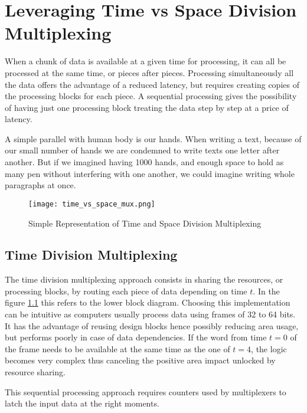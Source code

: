 \chapter{Leveraging Time vs Space Division Multiplexing}\label{ch:leveraging-time-division-multiplexing}

When a chunk of data is available at a given time for processing, it can all be processed at the same time, or pieces after pieces.
Processing simultaneously all the data offers the advantage of a reduced latency, but requires creating copies of the processing 
blocks for each piece. A sequential processing gives the possibility of having just one processing block treating the data step 
by step at a price of latency.

A simple parallel with human body is our hands. When writing a text, because of our small number of hands we are condemned to write 
texts one letter after another. But if we imagined having 1000 hands, and enough space to hold as many pen without interfering with one another,
we could imagine writing whole paragraphs at once.

\begin{figure}
    \centering
    \texttt{[image: time\_vs\_space\_mux.png]}
    \caption{Simple Representation of Time and Space Division Multiplexing}
    \label{fig:time-vs-space}
\end{figure}

\section{Time Division Multiplexing}\label{sec:time-division-multiplexing}
The time division multiplexing approach consists in sharing the resources, or processing blocks, by routing each piece of data 
depending on time \(t\). In the figure \ref{fig:time-vs-space} this refers to the lower block diagram. Choosing this implementation 
can be intuitive as computers usually process data using frames of 32 to 64 bits. It has the advantage of reusing design blocks hence
possibly reducing area usage, but performs poorly in case of data dependencies. If the word from time \(t=0\) of the frame needs to be 
available at the same time as the one of \(t=4\), the logic becomes very complex thus canceling the positive area impact unlocked by 
resource sharing.

This sequential processing approach requires counters used by multiplexers to latch the input data at the right moments.

